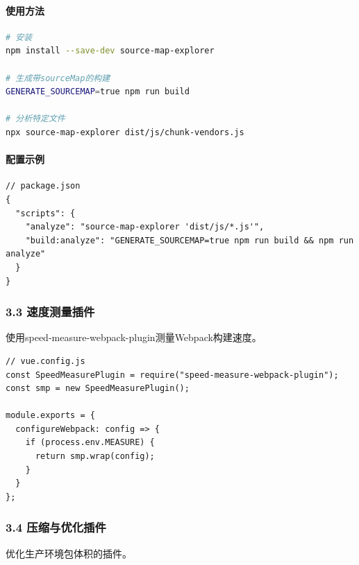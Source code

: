 \paragraph{使用方法}\label{ux4f7fux7528ux65b9ux6cd5}

\begin{lstlisting}[language=bash]
# 安装
npm install --save-dev source-map-explorer

# 生成带sourceMap的构建
GENERATE_SOURCEMAP=true npm run build

# 分析特定文件
npx source-map-explorer dist/js/chunk-vendors.js
\end{lstlisting}

\paragraph{配置示例}\label{ux914dux7f6eux793aux4f8b}

\begin{lstlisting}
// package.json
{
  "scripts": {
    "analyze": "source-map-explorer 'dist/js/*.js'",
    "build:analyze": "GENERATE_SOURCEMAP=true npm run build && npm run analyze"
  }
}
\end{lstlisting}

\subsubsection{3.3
速度测量插件}\label{ux901fux5ea6ux6d4bux91cfux63d2ux4ef6}

使用speed-measure-webpack-plugin测量Webpack构建速度。

\begin{lstlisting}
// vue.config.js
const SpeedMeasurePlugin = require("speed-measure-webpack-plugin");
const smp = new SpeedMeasurePlugin();

module.exports = {
  configureWebpack: config => {
    if (process.env.MEASURE) {
      return smp.wrap(config);
    }
  }
};
\end{lstlisting}

\subsubsection{3.4
压缩与优化插件}\label{ux538bux7f29ux4e0eux4f18ux5316ux63d2ux4ef6}

优化生产环境包体积的插件。

